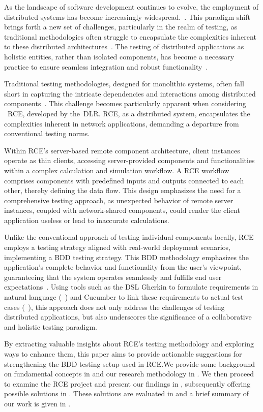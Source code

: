 As the landscape of software development continues to evolve, the employment of distributed systems has become increasingly widespread.~\cite{Xingang2018,Feldman1978}. This paradigm shift brings forth a new set of challenges, particularly in the realm of testing, as traditional methodologies often struggle to encapsulate the complexities inherent to these distributed architectures~\cite{Liu,Lima2017}. The testing of distributed applications as holistic entities, rather than isolated components, has become a necessary practice to ensure seamless integration and robust functionality~\cite{Liu,Lima2017}.

Traditional testing methodologies, designed for monolithic systems, often fall short in capturing the intricate dependencies and interactions among distributed components~\cite{Liu,Lima2017}. This challenge becomes particularly apparent when considering ~\acf{RCE}, developed by the~\acf{DLR}. \ac{RCE}, as a distributed system, encapsulates the complexities inherent in network applications, demanding a departure from conventional testing norms.

Within \ac{RCE}'s server-based remote component architecture, client instances operate as thin clients, accessing server-provided components and functionalities within a complex calculation and simulation workflow. A \ac{RCE} workflow comprises components with predefined inputs and outputs connected to each other, thereby defining the data flow. This design emphasizes the need for a comprehensive testing approach, as unexpected behavior of remote server instances, coupled with network-shared components, could render the client application useless or lead to inaccurate calculations.

Unlike the conventional approach of testing individual components locally, \ac{RCE} employs a testing strategy aligned with real-world deployment scenarios, implementing a \ac{BDD} testing strategy. This \ac{BDD} methodology emphasizes the application's complete behavior and functionality from the user's viewpoint, guaranteeing that the system operates seamlessly and fulfills end user expectations~\cite{wynne2012cucumber}. Using tools such as the \ac{DSL} Gherkin to formulate requirements in natural language (~) and Cucumber to link these requirements to actual test cases (~), this approach does not only address the challenges of testing distributed applications, but also underscores the significance of a collaborative and holistic testing paradigm.

By extracting valuable insights about \ac{RCE}'s testing methodology and exploring ways to enhance them, this paper aims to provide actionable suggestions for strengthening the \ac{BDD} testing setup used in \ac{RCE}.We provide some background on fundamental concepts in  and our research methodology in . We then proceed to examine the \ac{RCE} project and present our findings in , subsequently offering possible solutions in . These solutions are evaluated in and a brief summary of our work is given in .